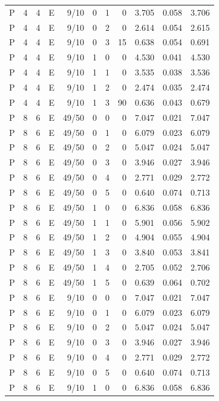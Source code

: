 \begin{longtable}{rrrrrrrrrrr}
P & 4 & 4 & E & 9/10 & 0 & 1 & 0 & 3.705 & 0.058 & 3.706 \\
P & 4 & 4 & E & 9/10 & 0 & 2 & 0 & 2.614 & 0.054 & 2.615 \\
P & 4 & 4 & E & 9/10 & 0 & 3 & 15 & 0.638 & 0.054 & 0.691 \\
P & 4 & 4 & E & 9/10 & 1 & 0 & 0 & 4.530 & 0.041 & 4.530 \\
P & 4 & 4 & E & 9/10 & 1 & 1 & 0 & 3.535 & 0.038 & 3.536 \\
P & 4 & 4 & E & 9/10 & 1 & 2 & 0 & 2.474 & 0.035 & 2.474 \\
P & 4 & 4 & E & 9/10 & 1 & 3 & 90 & 0.636 & 0.043 & 0.679 \\
P & 8 & 6 & E & 49/50 & 0 & 0 & 0 & 7.047 & 0.021 & 7.047 \\
P & 8 & 6 & E & 49/50 & 0 & 1 & 0 & 6.079 & 0.023 & 6.079 \\
P & 8 & 6 & E & 49/50 & 0 & 2 & 0 & 5.047 & 0.024 & 5.047 \\
P & 8 & 6 & E & 49/50 & 0 & 3 & 0 & 3.946 & 0.027 & 3.946 \\
P & 8 & 6 & E & 49/50 & 0 & 4 & 0 & 2.771 & 0.029 & 2.772 \\
P & 8 & 6 & E & 49/50 & 0 & 5 & 0 & 0.640 & 0.074 & 0.713 \\
P & 8 & 6 & E & 49/50 & 1 & 0 & 0 & 6.836 & 0.058 & 6.836 \\
P & 8 & 6 & E & 49/50 & 1 & 1 & 0 & 5.901 & 0.056 & 5.902 \\
P & 8 & 6 & E & 49/50 & 1 & 2 & 0 & 4.904 & 0.055 & 4.904 \\
P & 8 & 6 & E & 49/50 & 1 & 3 & 0 & 3.840 & 0.053 & 3.841 \\
P & 8 & 6 & E & 49/50 & 1 & 4 & 0 & 2.705 & 0.052 & 2.706 \\
P & 8 & 6 & E & 49/50 & 1 & 5 & 0 & 0.639 & 0.064 & 0.702 \\
P & 8 & 6 & E & 9/10 & 0 & 0 & 0 & 7.047 & 0.021 & 7.047 \\
P & 8 & 6 & E & 9/10 & 0 & 1 & 0 & 6.079 & 0.023 & 6.079 \\
P & 8 & 6 & E & 9/10 & 0 & 2 & 0 & 5.047 & 0.024 & 5.047 \\
P & 8 & 6 & E & 9/10 & 0 & 3 & 0 & 3.946 & 0.027 & 3.946 \\
P & 8 & 6 & E & 9/10 & 0 & 4 & 0 & 2.771 & 0.029 & 2.772 \\
P & 8 & 6 & E & 9/10 & 0 & 5 & 0 & 0.640 & 0.074 & 0.713 \\
P & 8 & 6 & E & 9/10 & 1 & 0 & 0 & 6.836 & 0.058 & 6.836 \\

\end{longtable}
